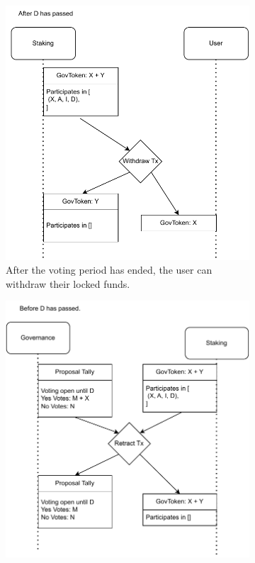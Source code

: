\documentclass[11pt]{article}
\begin{document}
\begin{figure}
\begin{subfigure}[b]{0.35\textwidth}
        \includegraphics[width=\textwidth]{figures/gov-withdraw-after.pdf}
        \caption{After the voting period has ended, the user can withdraw their locked funds.}
        \label{fig:utxo-flow-withdraw}
    \end{subfigure}
    \hfill
    \vspace{1em}
    \begin{subfigure}[b]{0.5\textwidth}
        \centering
        \includegraphics[width=\textwidth]{figures/gov-withdraw-before.pdf}

\end{subfigure}
\end{figure}
\end{document}

